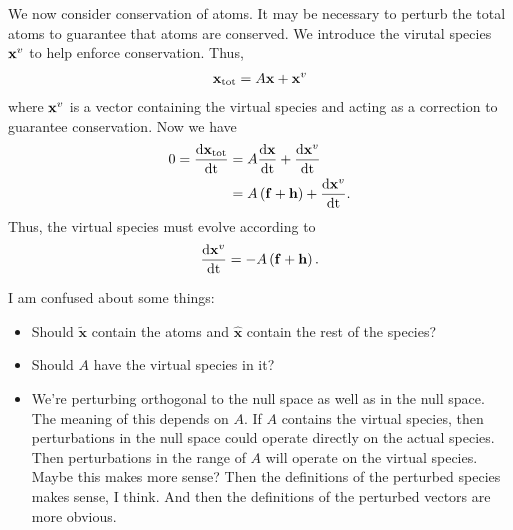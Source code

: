 We now consider conservation of atoms.  It may be necessary to perturb
the total atoms to guarantee that atoms are conserved.  We introduce 
the virutal species $\mathbf{x}^{v}$ to help enforce conservation.  Thus, 
\begin{align}
  \mathbf{x}_{\textrm{tot}} = A\mathbf{x} + \mathbf{x}^{v}
\end{align}
where $\mathbf{x}^{v}$ is a vector containing the virtual species and acting 
as a correction to guarantee conservation.  Now we have 
\begin{align}
  0 = \frac{\mathrm{d} \mathbf{x}_{\textrm{tot}}}{\mathrm{d} \mathrm{t}} &= A\frac{\mathrm{d} \mathbf{x}}{\mathrm{d} \mathrm{t}} + 
       \frac{\mathrm{d} \mathbf{x}^{v}}{\mathrm{d} \mathrm{t}} \\
    &= A\left(\mathbf{f} + \mathbf{h}\right) + \frac{\mathrm{d} \mathbf{x}^{v}}{\mathrm{d} \mathrm{t}}.
\end{align}
Thus, the virtual species must evolve according to 
\begin{align}
  \frac{\mathrm{d} \mathbf{x}^{v}}{\mathrm{d} \mathrm{t}} = -A\left(\mathbf{f} + \mathbf{h}\right).
\end{align}

\begin{tcolorbox}[arc is angular, title=Some thoughts...]
  I am confused about some things:
  \begin{itemize}
    \item Should $\widetilde{\mathbf{x}}$ contain the atoms 
          and $\widehat{\mathbf{x}}$ contain the rest of the 
          species?
    \item Should $A$ have the virtual species in it? 
    \item We're perturbing orthogonal to the null space as 
          well as in the null space.  The meaning of this 
          depends on $A$.  If $A$ contains the virtual 
          species, then perturbations in the null space could 
          operate directly on the actual species.  Then 
          perturbations in the range of $A$ will operate
          on the virtual species.  Maybe this makes more 
          sense?  Then the definitions of the perturbed 
          species makes sense, I think.  And then the 
          definitions of the perturbed vectors are more 
          obvious.
  \end{itemize}
\end{tcolorbox}
